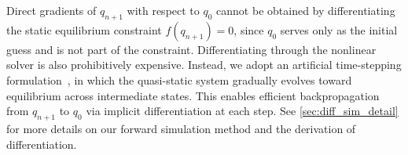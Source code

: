 Direct gradients of $q_{n+1}$ with respect to $q_0$ cannot be obtained by differentiating the static equilibrium constraint $f(q_{n+1}) = 0$, since $q_0$ serves only as the initial guess and is not part of the constraint. Differentiating through the nonlinear solver is also prohibitively expensive.  
Instead, we adopt an artificial time-stepping formulation~\cite{fang2021guaranteed}, in which the quasi-static system gradually evolves toward equilibrium across intermediate states. This enables efficient backpropagation from $q_{n+1}$ to $q_0$ via implicit differentiation at each step. See \autoref{sec:diff_sim_detail} for more details on our forward simulation method and the derivation of differentiation.
